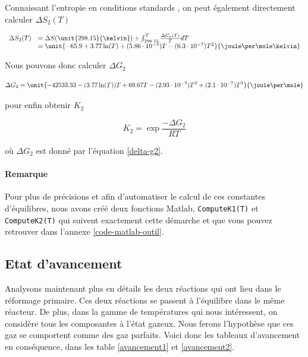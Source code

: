 Connaissant l'entropie en conditions standards \cite{atkins}, on peut
également directement calculer $\Delta S_2(T)$

$$
	\begin{array}{rl}
		 	\Delta S_2(T)	&= \Delta S(\unit{298.15}{\kelvin}) 
											 + \int_{298.15}^{T} \frac{\Delta C_p(T)}{T}dT \\
										&= \unit{-65.9 + 3.77 \ln(T) +(5.86\cdot 10^{-3})T -(6.3 \cdot 10^{-7})T^2}{\joule\per\mole\kelvin}
	\end{array}
$$	

Nous pouvons donc calculer $\Delta G_2$
 
 \begin{equation}
	\Delta G_2= \unit{-42533.33 - (3.77 \ln(T))T +69.67 T -(2.93 \cdot 10^{-3})T^2 + (2.1\cdot 10^{-7})T^3}{\joule\per\mole} 
	\label{delta-g2}
 \end{equation}
 
pour enfin obtenir $K_2$

	$$K_2 = \exp{\frac{-\Delta G_2}{RT}}$$

où $\Delta G_2$ est donné par l'équation \ref{delta-g2}.

\paragraph{Remarque} Pour plus de précisions et afin d'automatiser le calcul
de ces constantes d'équilibres, nous avons créé deux fonctions Matlab, \lstinline{ComputeK1(T)}
et \lstinline{ComputeK2(T)} qui suivent exactement cette démarche et que vous
pouvez retrouver dans l'annexe \ref{code-matlab-outil}.

\subsection{Etat d'avancement}
Analysons maintenant plus en détails les deux réactions qui ont lieu dans le réformage primaire.
Ces deux réactions se passent à l'équilibre dans le même réacteur. 
De plus, dans la gamme de températures qui nous intéressent, on considère tous les composantes à l'état gazeux.
Nous ferons l'hypothèse que ces gaz se comportent comme des gaz parfaits.
Voici donc les tableaux d'avancement en conséquence, dans les table \ref{avancement1} et \ref{avancement2}.
  
